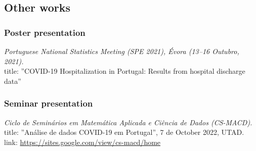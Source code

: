 \documentclass[11pt,oneside,a4paper,titlepage]{article}
\begin{document}
%
\subsection{  Other works}

\subsubsection{Poster presentation}
\textit{Portuguese National Statistics Meeting (SPE 2021), Évora (13–16 Outubro, 2021).}\\
title: ''COVID-19 Hospitalization in Portugal: Results from hospital discharge data''\\

\subsubsection{Seminar presentation}
\textit{Ciclo de Seminários em Matemática Aplicada e Ciência de Dados (CS-MACD).}\\
title: ''Análise de dados COVID-19 em Portugal'', 7 de October 2022, UTAD.\\
link: \href{https://sites.google.com/view/cs-macd/home}{https://sites.google.com/view/cs-macd/home}\\
\end{document}
